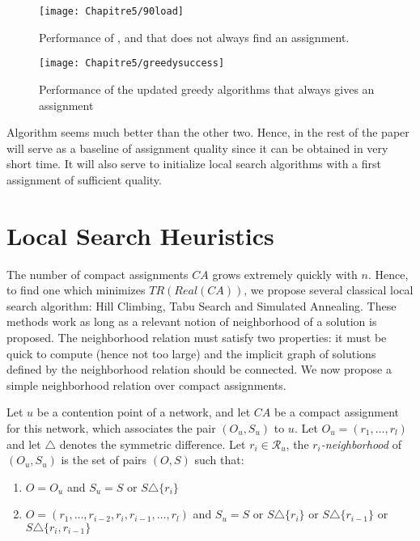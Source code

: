  	\begin{figure}
	\centering
	\texttt{[image: Chapitre5/90load]}
\caption{Performance of \greedydeadline, \greedynormalized and \greedypacked that does not always find an assignment.}
\label{fig:90load}
\end{figure}


\begin{figure}
	\centering
	\texttt{[image: Chapitre5/greedysuccess]}
\caption{Performance of the updated greedy algorithms that always gives an assignment} 
\label{fig:greedysuccess}
\end{figure}

Algorithm \hybridgreedynormalized seems much better than the other two. Hence, in the rest of the paper \hybridgreedynormalized will serve as a baseline of assignment quality since it can be obtained in very short time. It will also serve to initialize 
local search algorithms with a first assignment of sufficient quality.

\section{Local Search Heuristics}

The number of compact assignments $CA$ grows extremely quickly with $n$. Hence, to find one which minimizes $TR(Real(CA))$, we propose several classical local search algorithm: Hill Climbing, Tabu Search and Simulated Annealing. These methods work as long as a relevant notion of neighborhood of a solution is proposed. The neighborhood relation must satisfy two properties: it must be quick to compute (hence not too large) and the implicit graph of solutions defined
by the neighborhood relation should be connected. We now propose a simple neighborhood relation over compact assignments.

Let $u$ be a contention point of a network, and let $CA$ be a compact assignment for this network, 
 which associates the pair $(O_u,S_u)$ to $u$. Let $O_u = (r_1,\dots,r_l)$ and let $\triangle$ denotes the symmetric difference.   Let $r_i \in \mathcal{R}_u$, the \emph{$r_i$-neighborhood} of $(O_u,S_u)$ is the set of pairs $(O,S)$ such that:
 
 \begin{enumerate} 
 \item $O = O_u$ and $S_u = S$ or $S \triangle \{r_i\}$  
 \item $O = (r_1,\dots,r_{i-2},r_{i},r_{i-1},\dots,r_{l})$ and $S_u = S$ or $S \triangle \{r_i\}$ or  $S \triangle \{r_{i-1}\}$ or $S \triangle \{r_i,r_{i-1}\}$ 
 \end{enumerate}

